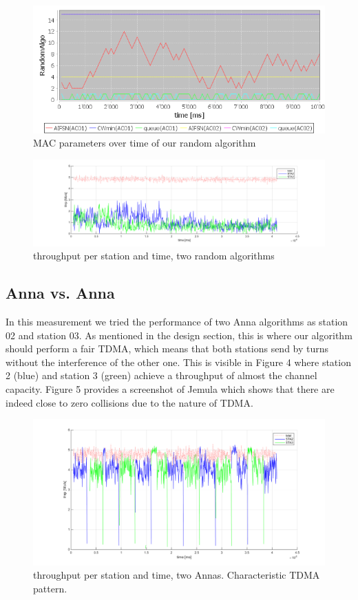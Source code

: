 \documentclass[12pt]{article}
\begin{document}
\begin{figure}[h!]
\centering
\includegraphics[width=\textwidth]{img/random_vs_random-50Mbps-PLOT.png}
\caption{MAC parameters over time of our random algorithm \label{plot:rr}}
\end{figure}

\begin{figure}[h!]
\centering
\includegraphics[width=\textwidth]{img/random_vs_random.png}
\caption{throughput per station and time, two random algorithms \label{fig:rr}}
\end{figure}

\subsection{Anna vs. Anna}
In this measurement we tried the performance of two Anna algorithms as station 02 and station 03.
As mentioned in the design section, this is where our algorithm should perform a fair TDMA, which means that both stations send by turns without the interference of the other one.
This is visible in Figure 4 where station 2 (blue) and station 3 (green) achieve a throughput of almost the channel capacity.
Figure 5 provides a screenshot of Jemula which shows that there are indeed close to zero collisions due to the nature of TDMA.
\begin{figure}[h!]
\centering
\includegraphics[width=\textwidth]{img/anna_vs_anna-5Mbps-TDMA.png}
\caption{throughput per station and time, two Annas. Characteristic TDMA pattern. \label{fig:aa}}
\end{figure}
\end{document}
